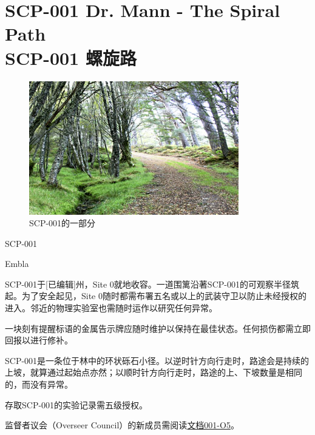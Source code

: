 \chapter[SCP-001 螺旋路]{
	SCP-001 Dr. Mann - The Spiral Path \\
	SCP-001 螺旋路
}

\label{chap:SCP-001.the.spiral.path}

\begin{figure}[H]
	\centering
	\includegraphics[width=0.5\linewidth]{images/SCP-001-the-spiral-path.jpg}
	\caption*{SCP-001的一部分}
\end{figure}

SCP-001

Embla

SCP-001于[已编辑]州，Site 0就地收容。一道围篱沿著SCP-001的可观察半径筑起。为了安全起见，Site 0随时都需布署五名或以上的武装守卫以防止未经授权的进入。邻近的物理实验室也需随时运作以研究任何异常。

一块刻有提醒标语的金属告示牌应随时维护以保持在最佳状态。任何损伤都需立即回报以进行修补。

SCP-001是一条位于林中的环状砾石小径。以逆时针方向行走时，路途会是持续的上坡，就算通过起始点亦然；以顺时针方向行走时，路途的上、下坡数量是相同的，而没有异常。

存取SCP-001的实验记录需五级授权。

监督者议会（Overseer Council）的新成员需阅读\hyperref[sec:DOC-001-05]{文档001-O5}。

\newpage


